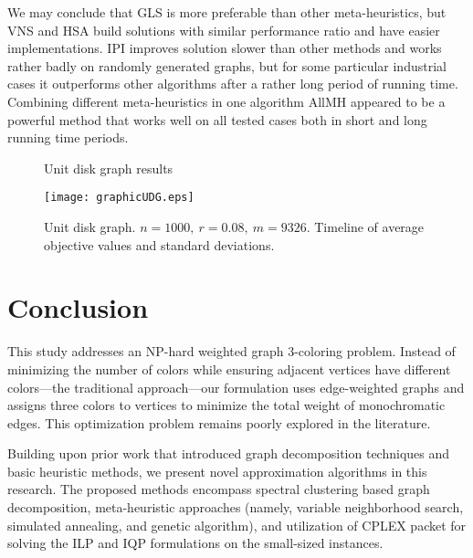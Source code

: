 \documentclass[runningheads]{llncs}
\begin{document}
We may conclude that GLS is more preferable than other meta-heuristics, but VNS and HSA build solutions with similar performance ratio and have easier implementations. IPI improves solution slower than other methods and works rather badly on randomly generated graphs, but for some particular industrial cases it outperforms other algorithms after a rather long period of running time. Combining different meta-heuristics in one algorithm AllMH appeared to be a powerful method that works well on all tested cases both in short and long running time periods.

\begin{figure}[!hbtp]
\centering
{} \hfill
{} \hfill
\caption{Unit disk graph results} \label{tableUDG}
\end{figure}

\begin{figure}
\centering
\texttt{[image: graphicUDG.eps]}
\caption{Unit disk graph. $n = 1000,\:r=0.08,\:m=9326$. Timeline of average objective values and standard deviations.} \label{graphicUDG}
\end{figure}

\section{Conclusion}

This study addresses an NP-hard weighted graph 3-coloring problem. Instead of minimizing the number of colors while ensuring adjacent vertices have different colors—the traditional approach—our formulation uses edge-weighted graphs and assigns three colors to vertices to minimize the total weight of monochromatic edges. This optimization problem remains poorly explored in the literature.

Building upon prior work that introduced graph decomposition techniques and basic heuristic methods, we present novel approximation algorithms in this research. The proposed methods encompass spectral clustering based graph decomposition, meta-heuristic approaches (namely, variable neighborhood search, simulated annealing, and genetic algorithm), and utilization of CPLEX packet for solving the ILP and IQP formulations on the small-sized instances.
\end{document}
